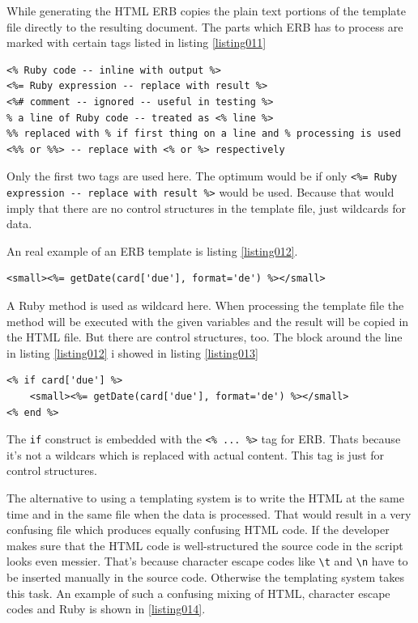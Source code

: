 While generating the HTML ERB copies the plain text portions of the template file directly to the resulting document.  The parts which ERB has to process are marked with certain tags listed in listing \ref{listing011}
\begin{lstlisting}[aboveskip=1\baselineskip, style=bash, caption=Recognised tags in ERB., label=listing011]
<% Ruby code -- inline with output %>
<%= Ruby expression -- replace with result %>
<%# comment -- ignored -- useful in testing %>
% a line of Ruby code -- treated as <% line %> 
%% replaced with % if first thing on a line and % processing is used
<%% or %%> -- replace with <% or %> respectively
\end{lstlisting}
Only the first two tags are used here. The optimum would be if only \lstinline{<%= Ruby expression -- replace with result %>} would be used. Because that would imply that there are no control structures in the template file, just wildcards for data.

An real example of an ERB template is listing \ref{listing012}.

\begin{lstlisting}[aboveskip=1\baselineskip, caption=Ruby method in ERB template., label=listing012]
<small><%= getDate(card['due'], format='de') %></small>
\end{lstlisting}

A Ruby method is used as wildcard here. When processing the template file the method will be executed with the given variables and the result will be copied in the HTML file. But there are control structures, too. The block around the line in listing \ref{listing012} i showed in listing \ref{listing013}

\begin{lstlisting}[aboveskip=1\baselineskip, caption=Ruby method in ERB template., label=listing013]
<% if card['due'] %>
	<small><%= getDate(card['due'], format='de') %></small>
<% end %>
\end{lstlisting}

The \lstinline{if} construct is embedded with the \lstinline{<% ... %>} tag for ERB. Thats because it's not a wildcars which is replaced with actual content. This tag is just for control structures.

The alternative to using a templating system is to write the HTML at the same time and in the same file when the data is processed. That would result in a very confusing file which produces equally confusing HTML code. If the developer makes sure that the HTML code is well-structured the source code in the script looks even messier. That's because character escape codes like \lstinline{\t} and \lstinline{\n} have to be inserted manually in the source code. Otherwise the templating system takes this task. An example of such a confusing mixing of HTML, character escape codes and Ruby is shown in \ref{listing014}.

